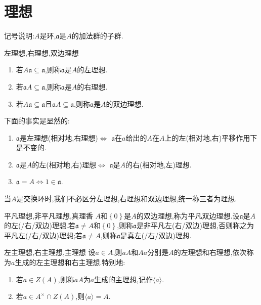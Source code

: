 \section{理想}

记号说明:$A$是环,$\mathfrak{a}$是$A$的加法群的子群.

\begin{definition}{左理想,右理想,双边理想}{}
	\begin{enumerate}
		\item 若$A\mathfrak{a}\subseteq\mathfrak{a}$,则称$\mathfrak{a}$是$A$的左理想.
		\item 若$\mathfrak{a}A\subseteq\mathfrak{a}$,则称$\mathfrak{a}$是$A$的右理想.
		\item 若$A\mathfrak{a}\subseteq\mathfrak{a}$且$\mathfrak{a}A\subseteq\mathfrak{a}$,则称$\mathfrak{a}$是$A$的双边理想.
	\end{enumerate}
\end{definition}

\begin{remark}{}{}
	下面的事实是显然的:
	\begin{enumerate}
		\item $\mathfrak{a}$是左理想(相对地,右理想)$\iff$ $\mathfrak{a}$在$a$给出的$A$在$A$上的左(相对地,右)平移作用下是不变的.
		\item $\mathfrak{a}$是$A$的左(相对地,右)理想$\iff$ $\mathfrak{a}$是$A$的右(相对地,左)理想.
		\item $\mathfrak{a}=A\iff 1\in\mathfrak{a}$.
	\end{enumerate}
	当$A$是交换环时,我们不必区分左理想,右理想和双边理想,统一称三者为理想.
\end{remark}

\begin{example}{平凡理想,非平凡理想,真理香}{}
	$A$和$\left\{0\right\}$是$A$的双边理想,称为平凡双边理想.设$\mathfrak{a}$是$A$的左(/右/双边)理想.若$\mathfrak{a}\neq A$和$\left\{0\right\}$,则称$\mathfrak{a}$是非平凡左(右/双边)理想,否则称之为平凡左(/右/双边)理想;若$\mathfrak{a}\neq A$,则称$\mathfrak{a}$是真左(/右/双边)理想.
\end{example}

\begin{example}{左主理想,右主理想,主理想}{}
	设$a\in A$,则$aA$和$Aa$分别是$A$的左理想和右理想,依次称为$a$生成的左主理想和右主理想.特别地:
	\begin{enumerate}
		\item 若$a\in Z\left(A\right)$,则称$aA$为$a$生成的主理想,记作$\langle a\rangle$.
		\item 若$a\in A^{\times}\cap Z\left(A\right)$,则$\langle a\rangle=A$.
	\end{enumerate}
\end{example}

